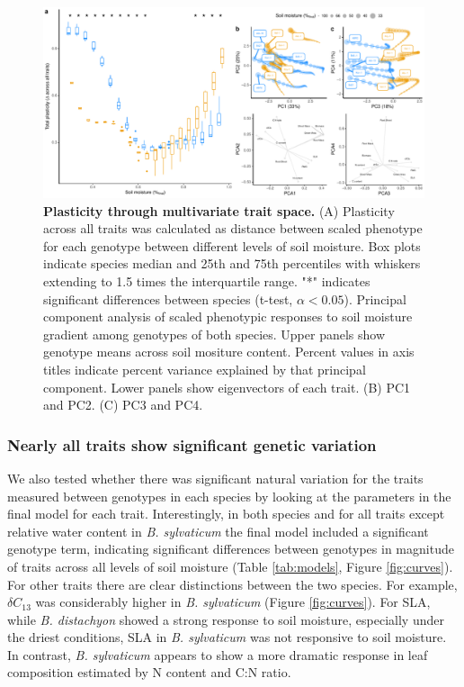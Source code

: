\documentclass[jou,floatsintext]{apa6}
\begin{document}
\begin{figure}[!h]
\includegraphics[width=\textwidth]{../Figures/pca_byspecies} \caption{\textbf{Plasticity through multivariate trait space.} (A) Plasticity across all traits was calculated as distance between scaled phenotype for each genotype between different levels of soil moisture. Box plots indicate species median and 25th and 75th percentiles with whiskers extending to 1.5 times the interquartile range. "*" indicates significant differences between species (t-test, \(\alpha < 0.05\)). Principal component analysis of scaled phenotypic responses to soil moisture gradient among genotypes of both species. Upper panels show genotype means across soil mositure content. Percent values in axis titles indicate percent variance explained by that principal component. Lower panels show eigenvectors of each trait. (B) PC1 and PC2. (C) PC3 and PC4.}\label{fig:pca}
\end{figure}

\hypertarget{nearly-all-traits-show-significant-genetic-variation}{%
\subsubsection{Nearly all traits show significant genetic variation}\label{nearly-all-traits-show-significant-genetic-variation}}

We also tested whether there was significant natural variation for the traits measured between genotypes in each species by looking at the parameters in the final model for each trait. Interestingly, in both species and for all traits except relative water content in \emph{B. sylvaticum} the final model included a significant genotype term, indicating significant differences between genotypes in magnitude of traits across all levels of soil moisture (Table \ref{tab:models}, Figure \ref{fig:curves}). For other traits there are clear distinctions between the two species. For example, \(\delta C_{13}\) was considerably higher in \emph{B. sylvaticum} (Figure \ref{fig:curves}). For SLA, while \emph{B. distachyon} showed a strong response to soil moisture, especially under the driest conditions, SLA in \emph{B. sylvaticum} was not responsive to soil moisture. In contrast, \emph{B. sylvaticum} appears to show a more dramatic response in leaf composition estimated by N content and C:N ratio.
\end{document}
